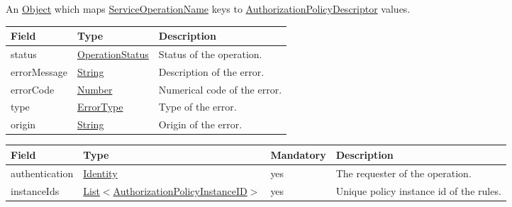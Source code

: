 \documentclass[a4paper]{arrowhead}
\newcommand{\pref}[1]{{\textcolor{ArrowheadGrey}{\hyperref[sec:model:primitives:#1]{#1}}}}
\begin{document}

An \pref{Object} which maps \pref{ServiceOperationName} keys to \hyperref[sec:model:AuthorizationPolicyDescriptor]{AuthorizationPolicyDescriptor} values.

\clearpage


\begin{table}[ht!]
\begin{tabularx}{\textwidth}{| p{4.25cm} | p{3.5cm} | X |} \hline
\rowcolor{gray!33} Field & Type      & Description \\ \hline
status & \pref{OperationStatus} & Status of the operation. \\ \hline
errorMessage & \pref{String} & Description of the error. \\ \hline
errorCode &\pref{Number}  & Numerical code of the error. \\ \hline
type & \pref{ErrorType} & Type of the error. \\ \hline
origin & \pref{String} & Origin of the error. \\ \hline
\end{tabularx}
\end{table}


\begin{table}[ht!]
\begin{tabularx}{\textwidth}{| p{3cm} | p{5.5cm} | p{2cm} | X |} \hline
\rowcolor{gray!33} Field & Type & Mandatory & Description \\ \hline
authentication &\hyperref[sec:model:Identity]{Identity} & yes & The requester of the operation. \\ \hline
instanceIds & \pref{List}$<$\pref{AuthorizationPolicyInstanceID}$>$ & yes & Unique policy instance id of the rules. \\ \hline
\end{tabularx}
\end{table}

\end{document}
